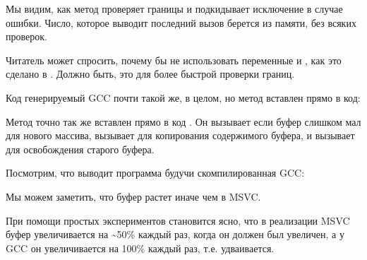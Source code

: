 Мы видим, как метод  проверяет границы и подкидывает исключение в случае ошибки.
Число, которое выводит последний вызов \printf берется из памяти, без всяких
проверок.

Читатель может спросить, почему бы не использовать переменные  и , 
как это сделано в .
Должно быть, это для более быстрой проверки границ.

Код генерируемый GCC почти такой же, в целом, но метод  вставлен прямо в код:



Метод  точно так же вставлен прямо в код \main.
Он вызывает  если буфер слишком мал для нового массива, вызывает  
для копирования содержимого буфера,
и вызывает  для освобождения старого буфера.

Посмотрим, что выводит программа будучи скомпилированная GCC:



Мы можем заметить, что буфер растет иначе чем в MSVC.

При помощи простых экспериментов становится ясно, что в реализации MSVC буфер увеличивается
на \textasciitilde{}50\% каждый раз,
когда он должен был увеличен,
а у GCC он увеличивается на 100\% каждый раз, т.е. удваивается.

